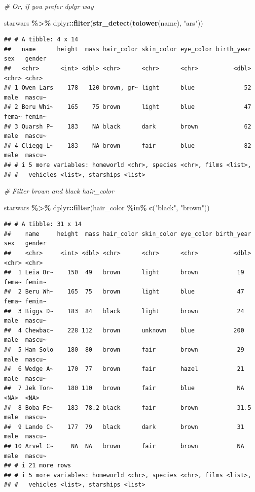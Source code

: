 \documentclass[
]{book}
\newenvironment{Shaded}{\begin{snugshade}}{\end{snugshade}}
\newcommand{\CommentTok}[1]{\textcolor[rgb]{0.56,0.35,0.01}{\textit{#1}}}
\newcommand{\FunctionTok}[1]{\textcolor[rgb]{0.13,0.29,0.53}{\textbf{#1}}}
\newcommand{\NormalTok}[1]{#1}
\newcommand{\SpecialCharTok}[1]{\textcolor[rgb]{0.81,0.36,0.00}{\textbf{#1}}}
\newcommand{\StringTok}[1]{\textcolor[rgb]{0.31,0.60,0.02}{#1}}
\begin{document}
\begin{Shaded}
\begin{Highlighting}[]
\CommentTok{\# Or, if you prefer dplyr way}

\NormalTok{starwars }\SpecialCharTok{\%\textgreater{}\%}
\NormalTok{  dplyr}\SpecialCharTok{::}\FunctionTok{filter}\NormalTok{(}\FunctionTok{str\_detect}\NormalTok{(}\FunctionTok{tolower}\NormalTok{(name), }\StringTok{"ars"}\NormalTok{))}
\end{Highlighting}
\end{Shaded}

\begin{verbatim}
## # A tibble: 4 x 14
##   name      height  mass hair_color skin_color eye_color birth_year sex   gender
##   <chr>      <int> <dbl> <chr>      <chr>      <chr>          <dbl> <chr> <chr> 
## 1 Owen Lars    178   120 brown, gr~ light      blue              52 male  mascu~
## 2 Beru Whi~    165    75 brown      light      blue              47 fema~ femin~
## 3 Quarsh P~    183    NA black      dark       brown             62 male  mascu~
## 4 Cliegg L~    183    NA brown      fair       blue              82 male  mascu~
## # i 5 more variables: homeworld <chr>, species <chr>, films <list>,
## #   vehicles <list>, starships <list>
\end{verbatim}

\begin{Shaded}
\begin{Highlighting}[]
\CommentTok{\# Filter brown and black hair\_color}

\NormalTok{starwars }\SpecialCharTok{\%\textgreater{}\%}
\NormalTok{  dplyr}\SpecialCharTok{::}\FunctionTok{filter}\NormalTok{(hair\_color }\SpecialCharTok{\%in\%} \FunctionTok{c}\NormalTok{(}\StringTok{"black"}\NormalTok{, }\StringTok{"brown"}\NormalTok{))}
\end{Highlighting}
\end{Shaded}

\begin{verbatim}
## # A tibble: 31 x 14
##    name     height  mass hair_color skin_color eye_color birth_year sex   gender
##    <chr>     <int> <dbl> <chr>      <chr>      <chr>          <dbl> <chr> <chr> 
##  1 Leia Or~    150  49   brown      light      brown           19   fema~ femin~
##  2 Beru Wh~    165  75   brown      light      blue            47   fema~ femin~
##  3 Biggs D~    183  84   black      light      brown           24   male  mascu~
##  4 Chewbac~    228 112   brown      unknown    blue           200   male  mascu~
##  5 Han Solo    180  80   brown      fair       brown           29   male  mascu~
##  6 Wedge A~    170  77   brown      fair       hazel           21   male  mascu~
##  7 Jek Ton~    180 110   brown      fair       blue            NA   <NA>  <NA>  
##  8 Boba Fe~    183  78.2 black      fair       brown           31.5 male  mascu~
##  9 Lando C~    177  79   black      dark       brown           31   male  mascu~
## 10 Arvel C~     NA  NA   brown      fair       brown           NA   male  mascu~
## # i 21 more rows
## # i 5 more variables: homeworld <chr>, species <chr>, films <list>,
## #   vehicles <list>, starships <list>
\end{verbatim}
\end{document}
